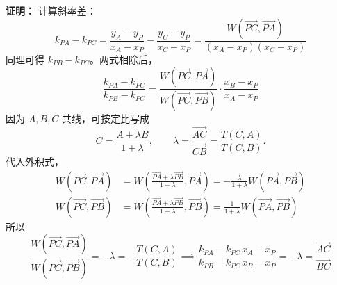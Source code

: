 \textbf{证明：}
计算斜率差：
$$ k_{PA} - k_{PC} = \frac{y_A-y_P}{x_A-x_P} - \frac{y_C-y_P}{x_C-x_P} = \frac{W(\overrightarrow{PC}, \overrightarrow{PA})}{(x_A-x_P)(x_C-x_P)} $$
同理可得 $k_{PB}-k_{PC}$。两式相除后，
$$ \frac{k_{PA}-k_{PC}}{k_{PB}-k_{PC}} = \frac{W(\overrightarrow{PC}, \overrightarrow{PA})}{W(\overrightarrow{PC}, \overrightarrow{PB})} \cdot \frac{x_B-x_P}{x_A-x_P} $$
因为 $A, B, C$ 共线，可按定比写成
\[
C = \frac{A + \lambda B}{1+\lambda},\qquad \lambda = \frac{\overrightarrow{AC}}{\overrightarrow{CB}} = \frac{T(C,A)}{T(C,B)}.
\]
代入外积式，
\begin{align*}
W(\overrightarrow{PC}, \overrightarrow{PA}) &= W\left(\frac{\overrightarrow{PA} + \lambda \overrightarrow{PB}}{1+\lambda}, \overrightarrow{PA}\right) = -\frac{\lambda}{1+\lambda} W(\overrightarrow{PA}, \overrightarrow{PB}) \\
W(\overrightarrow{PC}, \overrightarrow{PB}) &= W\left(\frac{\overrightarrow{PA} + \lambda \overrightarrow{PB}}{1+\lambda}, \overrightarrow{PB}\right) = \frac{1}{1+\lambda} W(\overrightarrow{PA}, \overrightarrow{PB})
\end{align*}
所以
$$ \frac{W(\overrightarrow{PC}, \overrightarrow{PA})}{W(\overrightarrow{PC}, \overrightarrow{PB})} = -\lambda = -\frac{T(C,A)}{T(C,B)} \implies\frac{k_{PA}-k_{PC}}{k_{PB}-k_{PC}} \frac{x_A-x_P}{x_B-x_P} = -\lambda = \frac{\overrightarrow{AC}}{\overrightarrow{BC}} $$

